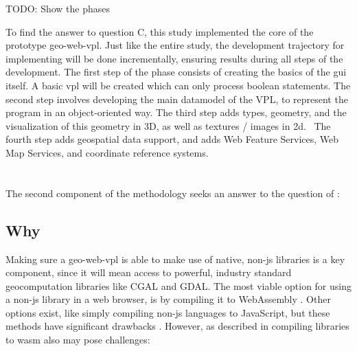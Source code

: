 \begin{note}
TODO: Show the phases
\end{note}

To find the answer to question C, this study implemented the core of the prototype \ac{geo-web-vpl}.
Just like the entire study, the development trajectory for implementing will be done incrementally, ensuring results during all steps of the development. 
The first step of the phase consists of creating the basics of the \ac{gui} itself. 
A basic \ac{vpl} will be created which can only process boolean statements. 
The second step involves developing the main datamodel of the VPL, to represent the program in an object-oriented way. 
The third step adds types, geometry, and the visualization of this geometry in 3D, as well as textures / images in 2d. \
The fourth step adds geospatial data support, and adds Web Feature Services, Web Map Services, and coordinate reference systems.  


\section{\mySubRQTwoTitle} 
\label{sec:method-two}
The second component of the methodology seeks an answer to the question of \mySubRQTwoTitle: \mySubRQTwo


\subsection*{Why}

Making sure a \ac{geo-web-vpl} is able to make use of native, non-js libraries is a key component, since it will mean access to powerful, industry standard geocomputation libraries like CGAL and GDAL. 
The most viable option for using a non-js library in a web browser, is by compiling it to WebAssembly \cite{haas_bringing_2017}.
Other options exist, like simply compiling non-js languages to JavaScript, but these methods have significant drawbacks \cite{haas_bringing_2017,jangda_not_2019}.
However, as described in \refsec{sec:bbg} compiling libraries to \ac{wasm} also may pose challenges:

